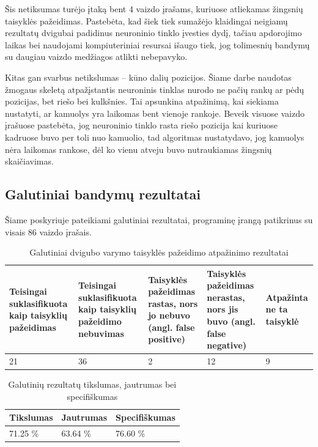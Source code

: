 \documentclass{VUMIFPSbakalaurinis}
\begin{document}
{Šis netiksumas turėjo įtaką bent 4 vaizdo įrašams, kuriuose atliekamas žingsnių taisyklės pažeidimas. Pastebėta, kad šiek tiek sumažėjo klaidingai neigiamų rezultatų dvigubai padidinus neuroninio tinklo įvesties dydį, tačiau apdorojimo laikas bei naudojami kompiuteriniai resursai išaugo tiek, jog tolimesnių bandymų su daugiau vaizdo medžiagos atlikti nebepavyko.

Kitas gan svarbus netikslumas – kūno dalių pozicijos. Šiame darbe naudotas žmogaus skeletą atpažįstantis neuroninis tinklas nurodo ne pačių rankų ar pėdų pozicijas, bet riešo bei kulkšnies. Tai apsunkina atpažinimą, kai siekiama nustatyti, ar kamuolys yra laikomas bent vienoje rankoje. Beveik visuose vaizdo įrašuose pastebėta, jog neuroninio tinklo rasta riešo pozicija kai kuriuose kadruose buvo per toli nuo kamuolio, tad algoritmas nustatydavo, jog kamuolys nėra laikomas rankose, dėl ko vienu atveju buvo nutraukiamas žingsnių skaičiavimas. 

\subsection{Galutiniai bandymų rezultatai}

Šiame poskyriuje pateikiami galutiniai rezultatai, programinę įrangą patikrinus su visais 86 vaizdo įrašais. 

\begin{table}[H]\footnotesize
	\centering
	\caption{Galutiniai dvigubo varymo taisyklės pažeidimo atpažinimo rezultatai}
	{\begin{tabular}{|p{3cm}|p{3cm}|p{3cm}|p{3cm}|p{2cm}|} \hline
			\textbf{Teisingai suklasifikuota kaip taisyklių pažeidimas} & \textbf{Teisingai suklasifikuota kaip taisyklių pažeidimo nebuvimas} & \textbf{Taisyklės pažeidimas rastas, nors jo nebuvo (angl. false positive)} & \textbf{Taisyklės pažeidimas nerastas, nors jis buvo (angl. false negative)} & \textbf{Atpažinta ne ta taisyklė} \\
			\hline
			21  & 36    & 2    & 12  &  9 \\
			\hline
	\end{tabular}}
	\label{tab:final_results}
\end{table}

\begin{table}[H]\footnotesize
	\centering
	\caption{Galutinių rezultatų tikslumas, jautrumas bei specifiškumas}
	{\begin{tabular}{|p{5cm}|p{5cm}|p{5cm}|} \hline
			\textbf{Tikslumas} & \textbf{Jautrumas} & \textbf{Specifiškumas} \\
			\hline
			71.25 \%  & 63.64 \%    & 76.60 \%    \\
			\hline
	\end{tabular}}
	\label{tab:final_results_percents}
\end{table}

}
\end{document}
